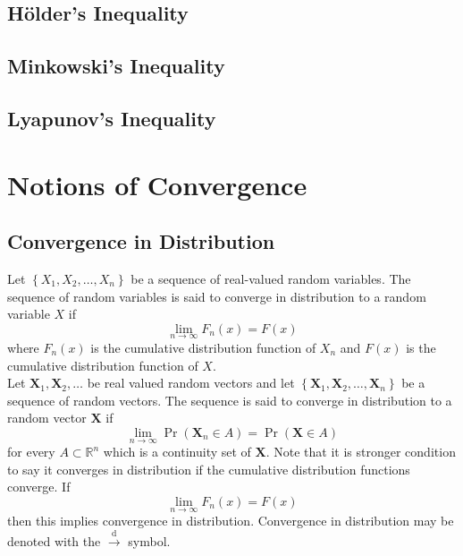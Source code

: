\documentclass[11pt]{report} %
\begin{document}
\subsection{H\"{o}lder's Inequality}

\subsection{Minkowski's Inequality}

\subsection{Lyapunov's Inequality}

\section{Notions of Convergence}

\subsection{Convergence in Distribution}

Let $\left\{X_{1}, X_{2}, \dots, X_{n} \right\}$ be a sequence of real-valued random variables. The sequence of random variables is said to converge in distribution to a random variable $X$ if
\begin{equation}
\lim_{n\to \infty}F_{n}\left(x\right) = F\left(x\right)
\end{equation}
where $F_{n}\left(x\right)$ is the cumulative distribution function of $X_{n}$ and $F\left(x\right)$ is the cumulative distribution function of $X$. \\

Let $\mathbf{X}_{1}, \mathbf{X}_{2}, \dots$ be real valued random vectors and let $\left\{\mathbf{X}_{1}, \mathbf{X}_{2}, \dots, \mathbf{X}_{n} \right\}$ be a sequence of random vectors. The sequence is said to converge in distribution to a random vector $\mathbf{X}$ if
\begin{equation}
\lim_{n\to\infty}\operatorname{Pr}\left(\mathbf{X}_{n}\in A\right) = \operatorname{Pr}\left(\mathbf{X}\in A\right)
\end{equation}
for every $A\subset \mathbb{R}^{n}$ which is a continuity set of $\mathbf{X}$. Note that it is stronger condition to say it converges in distribution if the cumulative distribution functions converge. If 
\begin{equation}
\lim_{n\to \infty}F_{n}\left(x\right) = F\left(x\right)
\end{equation}
then this implies convergence in distribution. Convergence in distribution may be denoted with the $\overset{\mathrm{d}}\to$ symbol.
\end{document}
